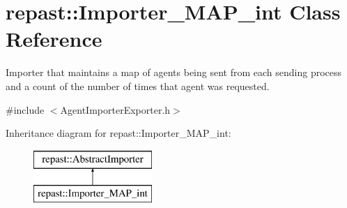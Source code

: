\hypertarget{classrepast_1_1_importer___m_a_p__int}{\section{repast\-:\-:Importer\-\_\-\-M\-A\-P\-\_\-int Class Reference}
\label{classrepast_1_1_importer___m_a_p__int}
}


Importer that maintains a map of agents being sent from each sending process and a count of the number of times that agent was requested.  




{\ttfamily \#include $<$Agent\-Importer\-Exporter.\-h$>$}

Inheritance diagram for repast\-:\-:Importer\-\_\-\-M\-A\-P\-\_\-int\-:\begin{figure}[H]
\begin{center}
\leavevmode
\includegraphics[height=2.000000cm]{classrepast_1_1_importer___m_a_p__int}
\end{center}
\end{figure}

